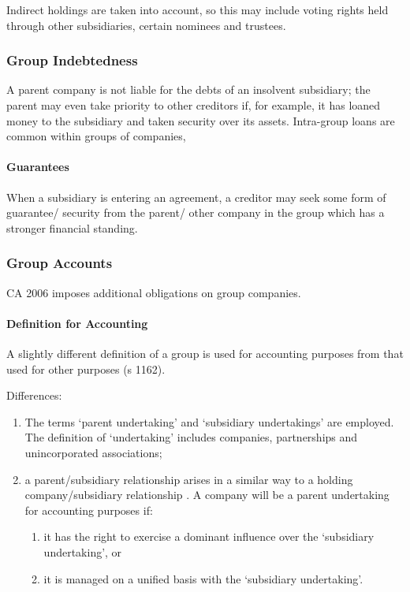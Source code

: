 \documentclass[
]{article}
\providecommand{\tightlist}{%
  \setlength{\itemsep}{0pt}\setlength{\parskip}{0pt}}
\begin{document}
Indirect holdings are taken into account, so this may include voting
rights held through other subsidiaries, certain nominees and trustees.

\hypertarget{group-indebtedness}{%
\subsubsection{Group Indebtedness}\label{group-indebtedness}}

A parent company is not liable for the debts of an insolvent subsidiary;
the parent may even take priority to other creditors if, for example, it
has loaned money to the subsidiary and taken security over its assets.
Intra-group loans are common within groups of companies,

\hypertarget{guarantees}{%
\paragraph{Guarantees}\label{guarantees}}

When a subsidiary is entering an agreement, a creditor may seek some
form of guarantee/ security from the parent/ other company in the group
which has a stronger financial standing.

\hypertarget{group-accounts}{%
\subsubsection{Group Accounts}\label{group-accounts}}

CA 2006 imposes additional obligations on group companies.

\hypertarget{definition-for-accounting}{%
\paragraph{Definition for Accounting}\label{definition-for-accounting}}

A slightly different definition of a group is used for accounting
purposes from that used for other purposes (s 1162).

Differences:

\begin{enumerate}
\tightlist
\item
  The terms `parent undertaking' and `subsidiary undertakings' are
  employed. The definition of `undertaking' includes companies,
  partnerships and unincorporated associations;
\item
  a parent/subsidiary relationship arises in a similar way to a holding
  company/subsidiary relationship . A company will be a parent
  undertaking for accounting purposes if:

  \begin{enumerate}
  \tightlist
  \item
    it has the right to exercise a dominant influence over the
    `subsidiary undertaking', or
  \item
    it is managed on a unified basis with the `subsidiary undertaking'.
  \end{enumerate}
\end{enumerate}
\end{document}
